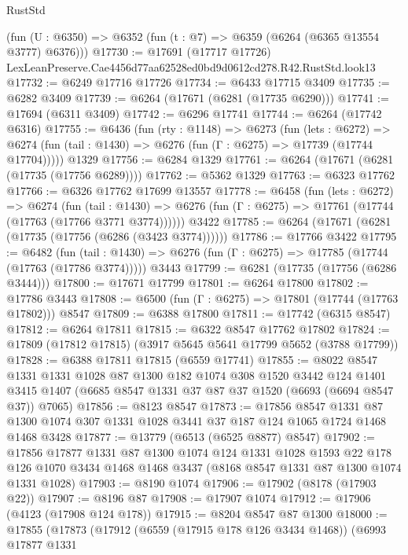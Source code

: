 \begin{lexlean}{RustStd}
\begin{coremodule}
    (fun (U : @6350) => @6352 (fun (t : @7) => @6359 (@6264 (@6365 @13554 @3777) @6376)))
@17730 := @17691
    (@17717 @17726)
    LexLeanPreserve.Cae4456d77aa62528ed0bd9d0612cd278.R42.RustStd.look13
@17732 := @6249 @17716 @17726
@17734 := @6433 @17715 @3409
@17735 := @6282 @3409
@17739 := @6264 (@17671 (@6281 (@17735 @6290)))
@17741 := @17694 (@6311 @3409)
@17742 := @6296 @17741
@17744 := @6264 (@17742 @6316)
@17755 := @6436
    (fun (rty : @1148) =>
    @6273
      (fun (lets : @6272) =>
      @6274 (fun (tail : @1430) => @6276 (fun (Γ : @6275) => @17739 (@17744 @17704)))))
    @1329
@17756 := @6284 @1329
@17761 := @6264 (@17671 (@6281 (@17735 (@17756 @6289))))
@17762 := @5362 @1329
@17763 := @6323 @17762
@17766 := @6326 @17762 @17699 @13557
@17778 := @6458
    (fun (lets : @6272) =>
    @6274
      (fun (tail : @1430) =>
      @6276 (fun (Γ : @6275) => @17761 (@17744 (@17763 (@17766 @3771 @3774))))))
    @3422
@17785 := @6264 (@17671 (@6281 (@17735 (@17756 (@6286 (@3423 @3774))))))
@17786 := @17766 @3422
@17795 := @6482
    (fun (tail : @1430) => @6276 (fun (Γ : @6275) => @17785 (@17744 (@17763 (@17786 @3774)))))
    @3443
@17799 := @6281 (@17735 (@17756 (@6286 @3444)))
@17800 := @17671 @17799
@17801 := @6264 @17800
@17802 := @17786 @3443
@17808 := @6500 (fun (Γ : @6275) => @17801 (@17744 (@17763 @17802))) @8547
@17809 := @6388 @17800
@17811 := @17742 (@6315 @8547)
@17812 := @6264 @17811
@17815 := @6322 @8547 @17762 @17802
@17824 := @17809 (@17812 @17815) (@3917 @5645 @5641 @17799 @5652 (@3788 @17799))
@17828 := @6388 @17811 @17815 (@6559 @17741)
@17855 := @8022
    @8547
    @1331
    @1331
    @1028
    @87
    @1300
    @182
    @1074
    @308
    @1520
    @3442
    @124
    @1401
    @3415
    @1407
    (@6685 @8547 @1331 @37 @87 @37 @1520 (@6693 (@6694 @8547 @37)) @7065)
@17856 := @8123 @8547
@17873 := @17856
    @8547
    @1331
    @87
    @1300
    @1074
    @307
    @1331
    @1028
    @3441
    @37
    @187
    @124
    @1065
    @1724
    @1468
    @1468
    @3428
@17877 := @13779 (@6513 (@6525 @8877) @8547)
@17902 := @17856
    @17877
    @1331
    @87
    @1300
    @1074
    @124
    @1331
    @1028
    @1593
    @22
    @178
    @126
    @1070
    @3434
    @1468
    @1468
    @3437
    (@8168 @8547 @1331 @87 @1300 @1074 @1331 @1028)
@17903 := @8190 @1074
@17906 := @17902 (@8178 (@17903 @22))
@17907 := @8196 @87
@17908 := @17907 @1074
@17912 := @17906 (@4123 (@17908 @124 @178))
@17915 := @8204 @8547 @87 @1300
@18000 := @17855
    (@17873
      (@17912
        (@6559 (@17915 @178 @126 @3434 @1468))
        (@6993
          @17877
          @1331

\end{coremodule}
\end{lexlean}
